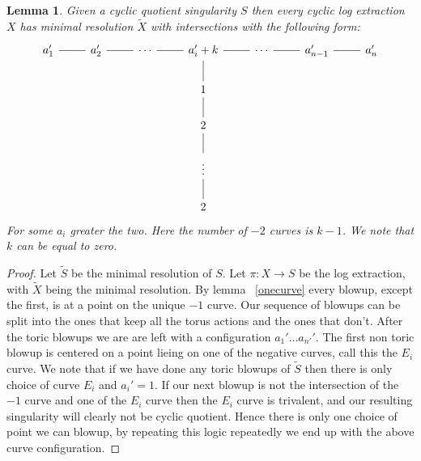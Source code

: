\documentclass[11pt]{amsart}
\theoremstyle{plain}
\newtheorem{lem}[thm]{Lemma}
\newcommand{\wt}[1]{\widetilde{#1}}
\begin{document}
\begin{lem}
Given a cyclic quotient singularity $S$ then every cyclic log extraction $X$ has minimal resolution $\wt{X}$ with intersections with the following form:
\[
\begin{tikzcd}
a_1' \arrow[r, no head] & a_2' \arrow[r, no head] & \cdots \arrow[r, no head] & a_i' + k \arrow[r, no head] \arrow[d, no head] & \cdots  \arrow[r, no head] & a_{n-1}' \arrow[r, no head] & a_n' \\
                       &                        &                           & 1                                             &                            &                            &     \\
                       &                        &                           & 2 \arrow[u, no head]                          &                            &                            &     \\
                       &                        &                           & \vdots \arrow[d, no head] \arrow[u, no head]  &                            &                            &     \\
                       &                        &                           & 2                                             &                            &                            &    
\end{tikzcd}
\]
For some $a_i$ greater the two. Here the number of $-2$ curves is $k-1$. We note that $k$ can be equal to zero.
\end{lem}

\begin{proof}
Let $\widetilde{S}$ be the minimal resolution of $S$. Let $\pi : X \rightarrow S$ be the log extraction, with $\widetilde{X}$ being the minimal resolution. By lemma ~\ref{onecurve} every  blowup, except the first, is at a point on the unique $-1$ curve. Our sequence of blowups can be split into the ones that keep all the torus actions and the ones that don't. After the toric blowups we are are left with a configuration $a_1' \dots a_{n'}'$. The first non toric blowup is centered on a point lieing on one of the negative curves, call this the $E_i$ curve. We note that if we have done any toric blowups of $\wt{S}$ then there is only choice of curve $E_i$ and $a_i' = 1$. If our next blowup is not the intersection of the $-1$ curve and one of the $E_i$ curve then the $E_i$ curve is trivalent, and our resulting singularity will clearly not be cyclic quotient. Hence there is only one choice of point we can blowup, by repeating this logic repeatedly we end up with the above curve configuration.
\end{proof}
\end{document}
